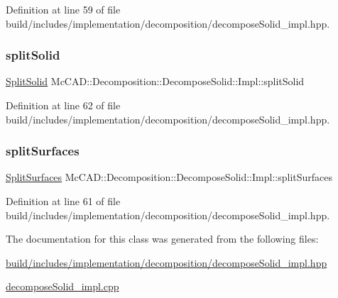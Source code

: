 Definition at line 59 of file build/includes/implementation/decomposition/decompose\+Solid\+\_\+impl.\+hpp.

\mbox{\label{classMcCAD_1_1Decomposition_1_1DecomposeSolid_1_1Impl_a8f68c947c10927a2a6ae1f5f864bd74f}} 
\subsubsection{\texorpdfstring{split\+Solid}{splitSolid}}
{\footnotesize\ttfamily \hyperlink{classMcCAD_1_1Decomposition_1_1SplitSolid}{Split\+Solid} Mc\+C\+A\+D\+::\+Decomposition\+::\+Decompose\+Solid\+::\+Impl\+::split\+Solid}



Definition at line 62 of file build/includes/implementation/decomposition/decompose\+Solid\+\_\+impl.\+hpp.

\mbox{\label{classMcCAD_1_1Decomposition_1_1DecomposeSolid_1_1Impl_a5e72556bef4688c0c2c9de93cfcd8f55}} 
\subsubsection{\texorpdfstring{split\+Surfaces}{splitSurfaces}}
{\footnotesize\ttfamily \hyperlink{classMcCAD_1_1Decomposition_1_1SplitSurfaces}{Split\+Surfaces} Mc\+C\+A\+D\+::\+Decomposition\+::\+Decompose\+Solid\+::\+Impl\+::split\+Surfaces}



Definition at line 61 of file build/includes/implementation/decomposition/decompose\+Solid\+\_\+impl.\+hpp.



The documentation for this class was generated from the following files\+:\begin{DoxyCompactItemize}
\item 
\hyperlink{build_2includes_2implementation_2decomposition_2decomposeSolid__impl_8hpp}{build/includes/implementation/decomposition/decompose\+Solid\+\_\+impl.\+hpp}\item 
\hyperlink{decomposeSolid__impl_8cpp}{decompose\+Solid\+\_\+impl.\+cpp}\end{DoxyCompactItemize}
